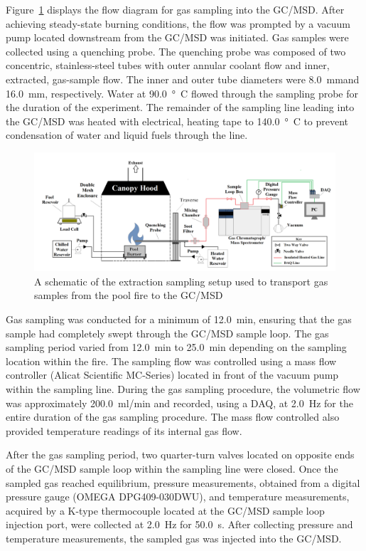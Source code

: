 \documentclass[12pt]{article}
\begin{document}
Figure~\ref{fig:Experimental_Setup} displays the flow diagram for gas sampling into the GC/MSD. After achieving steady-state burning conditions, the flow was prompted by a vacuum pump located downstream from the GC/MSD was initiated. Gas samples were collected using a quenching probe. The quenching probe was composed of two concentric, stainless-steel tubes with outer annular coolant flow and inner, extracted, gas-sample flow. The inner and outer tube diameters were \SI{8.0}{mm}and \SI{16.0}{mm}, respectively. Water at \SI{90.0}{\degree C} flowed through the sampling probe for the duration of the experiment. The remainder of the sampling line leading into the GC/MSD was heated with electrical, heating tape to \SI{140.0}{\degree C} to prevent condensation of water and liquid fuels through the line.

\begin{figure}
	\centering
\includegraphics[width=\textwidth,keepaspectratio]{Experimental_Setup.png}
	\caption[A schematic of the gas sampling procedure]{A schematic of the extraction sampling setup used to transport gas samples from the pool fire to the GC/MSD}
	\label{fig:Experimental_Setup}
\end{figure}

Gas sampling was conducted for a minimum of \SI{12.0}{min}, ensuring that the gas sample had completely swept through the GC/MSD sample loop. The gas sampling period varied from \SI{12.0}{min} to \SI{25.0}{min} depending on the sampling location within the fire. The sampling flow was controlled using a mass flow controller (Alicat Scientific MC-Series) located in front of the vacuum pump within the sampling line. During the gas sampling procedure, the volumetric flow was approximately \SI{200.0}{ml/min} and recorded, using a DAQ, at \SI{2.0}{\hertz} for the entire duration of the gas sampling procedure. The mass flow controlled also provided temperature readings of its internal gas flow.

After the gas sampling period, two quarter-turn valves located on opposite ends of the GC/MSD sample loop within the sampling line were closed. Once the sampled gas reached equilibrium, pressure measurements, obtained from a digital pressure gauge (OMEGA DPG409-030DWU), and temperature measurements, acquired by a K-type thermocouple located at the GC/MSD sample loop injection port, were collected at \SI{2.0}{\hertz} for \SI{50.0}{s}. After collecting pressure and temperature measurements, the sampled gas was injected into the GC/MSD.
\end{document}
